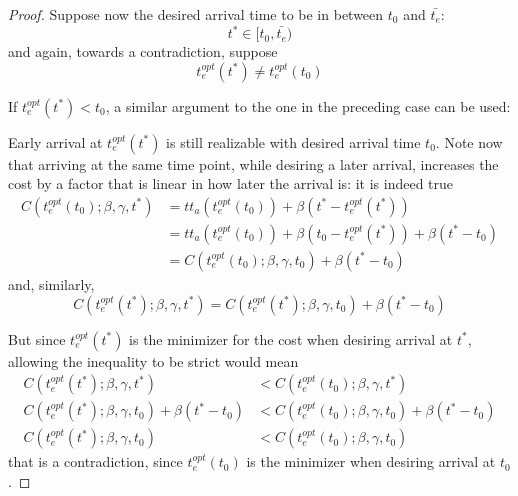 \begin{proof}
  Suppose now the desired arrival time to be in between \(t_0\) and \(\bar{t_e}\):
  \begin{equation*}
    t^* \in [t_0, \bar{t_e})
  \end{equation*}
  and again, towards a contradiction, suppose
  \begin{equation*}
    t_e^{opt}(t^*) \neq t_e^{opt}(t_0)
  \end{equation*}

  If \(t_e^{opt}(t^*) < t_0\), a similar argument to the one in the preceding case can be used:
  
  Early arrival at \(t_e^{opt}(t^*)\) is still realizable with desired arrival time \(t_0\).
  Note now that arriving at the same time point,
  while desiring a later arrival, increases the cost by a factor that is linear in how later the arrival is:
  it is indeed true
  \begin{equation}
    \label{eq:shifting_desired}
    \begin{split}
      C(t_e^{opt}(t_0); \beta, \gamma, t^*) & = tt_a(t_e^{opt}(t_0)) + \beta(t^* - t_e^{opt}(t^*)) \\
                                            & = tt_a(t_e^{opt}(t_0)) + \beta(t_0 - t_e^{opt}(t^*)) + \beta(t^* - t_0) \\
                                            & = C(t_e^{opt}(t_0); \beta, \gamma, t_0) + \beta(t^* - t_0)
    \end{split}
  \end{equation}
  and, similarly,
  \begin{equation*}
    C(t_e^{opt}(t^*); \beta, \gamma, t^*) = C(t_e^{opt}(t^*); \beta, \gamma, t_0) + \beta(t^* - t_0)
  \end{equation*}

  But since \(t_e^{opt}(t^*)\) is the minimizer for the cost when desiring arrival at \(t^*\),
  allowing the inequality to be strict would mean
  \begin{align*}
    C(t_e^{opt}(t^*); \beta, \gamma, t^*) & < C(t_e^{opt}(t_0); \beta, \gamma, t^*) \\
    C(t_e^{opt}(t^*); \beta, \gamma, t_0) + \beta(t^* - t_0) & < C(t_e^{opt}(t_0); \beta, \gamma, t_0) + \beta(t^* - t_0) \\
    C(t_e^{opt}(t^*); \beta, \gamma, t_0) & < C(t_e^{opt}(t_0); \beta, \gamma, t_0)
  \end{align*}
  that is a contradiction, since \(t_e^{opt}(t_0)\) is the minimizer when desiring arrival at \(t_0\).


\end{proof}
